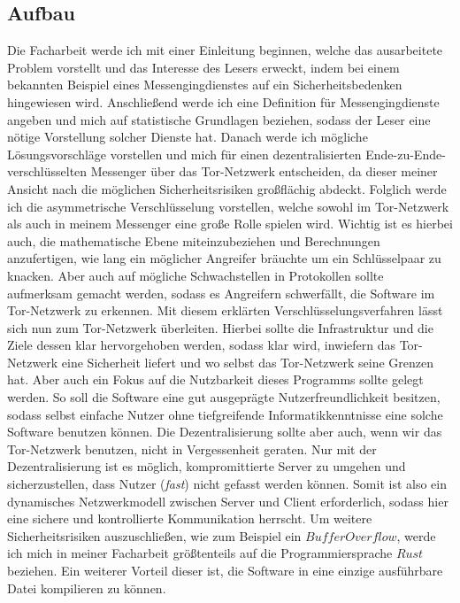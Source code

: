 \documentclass[a4paper,10pt,ngerman,
  headheight=28pt,]{scrartcl}
\begin{document}
\subsection{Aufbau}
Die Facharbeit werde ich mit einer Einleitung beginnen, welche das ausarbeitete Problem vorstellt und das Interesse des Lesers erweckt, indem bei einem bekannten Beispiel eines Messengingdienstes auf ein Sicherheitsbedenken hingewiesen wird. Anschließend werde ich eine Definition für Messengingdienste angeben und mich auf statistische Grundlagen beziehen, sodass der Leser eine nötige Vorstellung solcher Dienste hat. Danach werde ich mögliche Lösungsvorschläge vorstellen und mich für einen dezentralisierten Ende-zu-Ende-verschlüsselten Messenger über das Tor-Netzwerk entscheiden, da dieser meiner Ansicht nach die möglichen Sicherheitsrisiken großflächig abdeckt. Folglich werde ich die asymmetrische Verschlüsselung vorstellen, welche sowohl im Tor-Netzwerk als auch in meinem Messenger eine große Rolle spielen wird. Wichtig ist es hierbei auch, die mathematische Ebene miteinzubeziehen und Berechnungen anzufertigen, wie lang ein möglicher Angreifer bräuchte um ein Schlüsselpaar zu knacken. Aber auch auf mögliche Schwachstellen in Protokollen sollte aufmerksam gemacht werden, sodass es Angreifern schwerfällt, die Software im Tor-Netzwerk zu erkennen. Mit diesem erklärten Verschlüsselungsverfahren lässt sich nun zum Tor-Netzwerk überleiten. Hierbei sollte die Infrastruktur und die Ziele dessen klar hervorgehoben werden, sodass klar wird, inwiefern das Tor-Netzwerk eine Sicherheit liefert und wo selbst das Tor-Netzwerk seine Grenzen hat. Aber auch ein Fokus auf die Nutzbarkeit dieses Programms sollte gelegt werden. So soll die Software eine gut ausgeprägte Nutzerfreundlichkeit besitzen, sodass selbst einfache Nutzer ohne tiefgreifende Informatikkenntnisse eine solche Software benutzen können. Die Dezentralisierung sollte aber auch, wenn wir das Tor-Netzwerk benutzen, nicht in Vergessenheit geraten. Nur mit der Dezentralisierung ist es möglich, kompromittierte Server zu umgehen und sicherzustellen, dass Nutzer (\textit{fast}) nicht gefasst werden können. Somit ist also ein dynamisches Netzwerkmodell zwischen Server und Client erforderlich, sodass hier eine sichere und kontrollierte Kommunikation herrscht. Um weitere Sicherheitsrisiken auszuschließen, wie zum Beispiel ein $BufferOverflow$, werde ich mich in meiner Facharbeit größtenteils auf die Programmiersprache $Rust$ beziehen. Ein weiterer Vorteil dieser ist, die Software in eine einzige ausführbare Datei kompilieren zu können.
\end{document}
